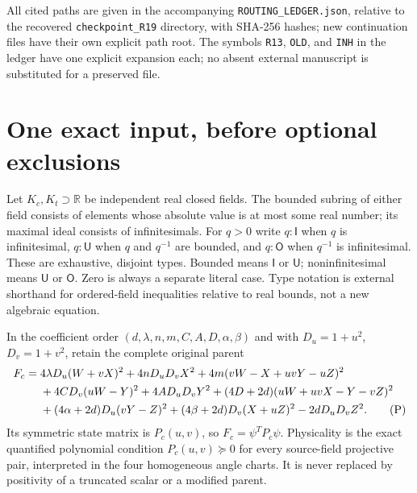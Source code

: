 \documentclass[11pt]{article}
\newcommand{\R}{\mathbb R}
\newcommand{\I}{\mathsf I}
\newcommand{\U}{\mathsf U}
\newcommand{\Otype}{\mathsf O}
\begin{document}
All cited paths are given in the accompanying \texttt{ROUTING\_LEDGER.json},
relative to the recovered \texttt{checkpoint\_R19} directory, with
SHA-256 hashes; new continuation files have their own explicit path root.
The symbols \texttt{R13}, \texttt{OLD}, and \texttt{INH}
in the ledger have one explicit expansion each; no absent external
manuscript is substituted for a preserved file.

\section{One exact input, before optional exclusions}

Let $K_c,K_t\supset\R$ be independent real closed fields. The bounded
subring of either field consists of elements whose absolute value is
at most some real number; its maximal ideal consists of infinitesimals.
For $q>0$ write $q:\I$ when $q$ is infinitesimal, $q:\U$ when $q$
and $q^{-1}$ are bounded, and $q:\Otype$ when $q^{-1}$ is infinitesimal.
These are exhaustive, disjoint types. Bounded means $\I$ or $\U$;
noninfinitesimal means $\U$ or $\Otype$. Zero is always a separate
literal case. Type notation is external shorthand for ordered-field
inequalities relative to real bounds, not a new algebraic equation.

In the coefficient order $(d,\lambda,n,m,C,A,D,\alpha,\beta)$ and
with $D_u=1+u^2$, $D_v=1+v^2$, retain the complete original parent
\begin{align}
F_c={}&4\lambda D_u(W+vX)^2+4nD_uD_vX^2
 +4m(vW-X+uvY-uZ)^2\notag\\
&+4CD_v(uW-Y)^2+4AD_uD_vY^2
 +(4D+2d)(uW+uvX-Y-vZ)^2\notag\\
&+(4\alpha+2d)D_u(vY-Z)^2
 +(4\beta+2d)D_v(X+uZ)^2-2dD_uD_vZ^2. \tag{P}
\end{align}
Its symmetric state matrix is $P_c(u,v)$, so $F_c=\psi^TP_c\psi$.
Physicality is the exact quantified polynomial condition
$P_c(u,v)\succeq0$ for every source-field projective pair, interpreted
in the four homogeneous angle charts. It is never replaced by
positivity of a truncated scalar or a modified parent.
\end{document}
